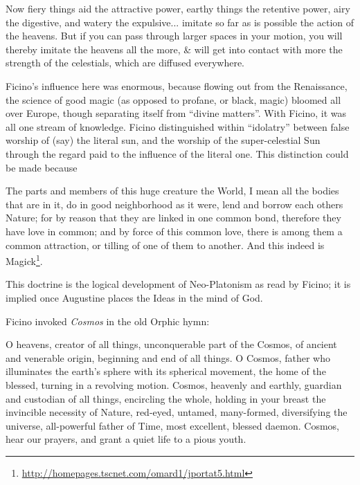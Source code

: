 \begin{quotex}
Now fiery things aid the attractive power, earthy things the retentive power, airy the digestive, and watery the expulsive... imitate so far as is possible the action of the heavens. But if you can pass through larger spaces in your motion, you will thereby imitate the heavens all the more, \& will get into contact with more the strength of the celestials, which are diffused everywhere.
\end{quotex}


Ficino's influence here was enormous, because flowing out from the Renaissance, the science of good magic (as opposed to profane, or black, magic) bloomed all over Europe, though separating itself from ``divine matters''. With Ficino, it was all one stream of knowledge. Ficino distinguished within ``idolatry'' between false worship of (say) the literal sun, and the worship of the super-celestial Sun through the regard paid to the influence of the literal one. This distinction could be made because

\begin{quotex}
The parts and members of this huge creature the World, I mean all the bodies that are in it, do in good neighborhood as it were, lend and borrow each others Nature; for by reason that they are linked in one common bond, therefore they have love in common; and by force of this common love, there is among them a common attraction, or tilling of one of them to another. And this indeed is Magick\footnote{\url{http://homepages.tscnet.com/omard1/jportat5.html}}.
\end{quotex}


This doctrine is the logical development of Neo-Platonism as read by Ficino; it is implied once Augustine places the Ideas in the mind of God.

Ficino invoked \emph{Cosmos} in the old Orphic hymn:

\begin{quotex}
O heavens, creator of all things, unconquerable part of the Cosmos, of ancient and venerable origin, beginning and end of all things. O Cosmos, father who illuminates the earth's sphere with its spherical movement, the home of the blessed, turning in a revolving motion. Cosmos, heavenly and earthly, guardian and custodian of all things, encircling the whole, holding in your breast the invincible necessity of Nature, red-eyed, untamed, many-formed, diversifying the universe, all-powerful father of Time, most excellent, blessed daemon. Cosmos, hear our prayers, and grant a quiet life to a pious youth.
\end{quotex}


